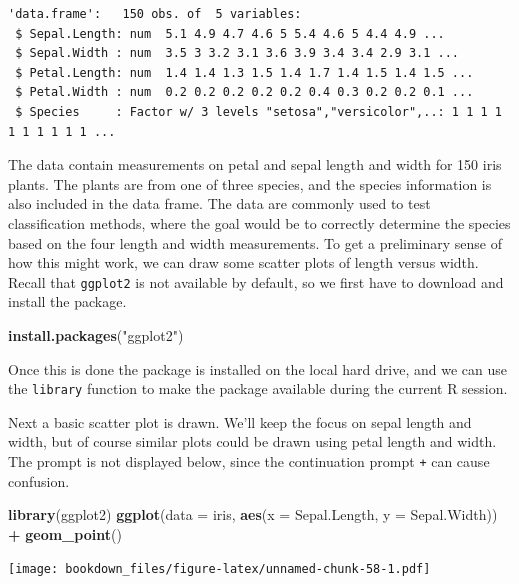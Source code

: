 \documentclass[
]{krantz}
\makeatletter
\newenvironment{Shaded}{\begin{snugshade}}{\end{snugshade}}
\newcommand{\DataTypeTok}[1]{\textcolor[rgb]{0.27,0.27,0.27}{#1}}
\newcommand{\KeywordTok}[1]{\textcolor[rgb]{0.27,0.27,0.27}{\textbf{#1}}}
\newcommand{\NormalTok}[1]{#1}
\newcommand{\OperatorTok}[1]{\textcolor[rgb]{0.43,0.43,0.43}{\textbf{#1}}}
\newcommand{\StringTok}[1]{\textcolor[rgb]{0.5,0.5,0.5}{#1}}
\newenvironment{kframe}{%
\medskip{}
\setlength{\fboxsep}{.8em}
 \def\at@end@of@kframe{}%
 \ifinner\ifhmode%
  \def\at@end@of@kframe{\end{minipage}}%
  \begin{minipage}{\columnwidth}%
 \fi\fi%
 \def\FrameCommand##1{\hskip\@totalleftmargin \hskip-\fboxsep
 \colorbox{shadecolor}{##1}\hskip-\fboxsep
     \hskip-\linewidth \hskip-\@totalleftmargin \hskip\columnwidth}%
 \MakeFramed {\advance\hsize-\width
   \@totalleftmargin\z@ \linewidth\hsize
   \@setminipage}}%
 {\par\unskip\endMakeFramed%
 \at@end@of@kframe}
\renewenvironment{Shaded}{\begin{kframe}}{\end{kframe}}
\makeatother
\begin{document}
\begin{verbatim}
'data.frame':	150 obs. of  5 variables:
 $ Sepal.Length: num  5.1 4.9 4.7 4.6 5 5.4 4.6 5 4.4 4.9 ...
 $ Sepal.Width : num  3.5 3 3.2 3.1 3.6 3.9 3.4 3.4 2.9 3.1 ...
 $ Petal.Length: num  1.4 1.4 1.3 1.5 1.4 1.7 1.4 1.5 1.4 1.5 ...
 $ Petal.Width : num  0.2 0.2 0.2 0.2 0.2 0.4 0.3 0.2 0.2 0.1 ...
 $ Species     : Factor w/ 3 levels "setosa","versicolor",..: 1 1 1 1 1 1 1 1 1 1 ...
\end{verbatim}

The data contain measurements on petal and sepal length and width for 150 iris plants. The plants are from one of three species, and the species information is also included in the data frame. The data are commonly used to test classification methods, where the goal would be to correctly determine the species based on the four length and width measurements. To get a preliminary sense of how this might work, we can draw some scatter plots of length versus width. Recall that \texttt{ggplot2} is not available by default, so we first have to download and install the package.

\begin{Shaded}
\begin{Highlighting}[]
\KeywordTok{install.packages}\NormalTok{(}\StringTok{"ggplot2"}\NormalTok{)}
\end{Highlighting}
\end{Shaded}

Once this is done the package is installed on the local hard drive, and we can use the \texttt{library} function to make the package available during the current R session.

Next a basic scatter plot is drawn. We'll keep the focus on sepal length and width, but of course similar plots could be drawn using petal length and width. The prompt is not displayed below, since the continuation prompt \texttt{+} can cause confusion.

\begin{Shaded}
\begin{Highlighting}[]
\KeywordTok{library}\NormalTok{(ggplot2)}
\KeywordTok{ggplot}\NormalTok{(}\DataTypeTok{data =}\NormalTok{ iris, }\KeywordTok{aes}\NormalTok{(}\DataTypeTok{x =}\NormalTok{ Sepal.Length, }\DataTypeTok{y =}\NormalTok{ Sepal.Width)) }\OperatorTok{+}\StringTok{ }
\StringTok{    }\KeywordTok{geom\_point}\NormalTok{()}
\end{Highlighting}
\end{Shaded}

\texttt{[image: bookdown\_files/figure-latex/unnamed-chunk-58-1.pdf]}
\end{document}
